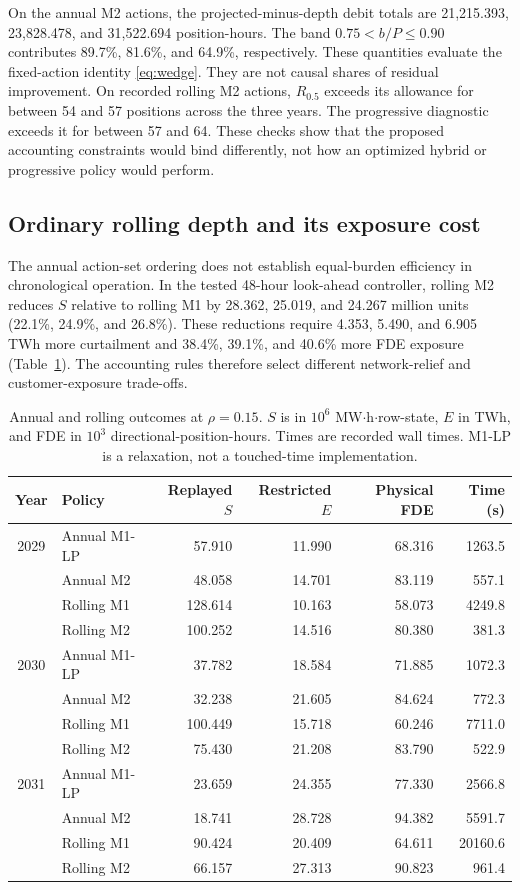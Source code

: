 \documentclass[10pt,journal]{IEEEtran}
\begin{document}
On the annual M2 actions, the projected-minus-depth debit totals are 21,215.393, 23,828.478, and 31,522.694 position-hours. The band $0.75<b/P\leq0.90$ contributes 89.7\%, 81.6\%, and 64.9\%, respectively. These quantities evaluate the fixed-action identity \eqref{eq:wedge}. They are not causal shares of residual improvement. On recorded rolling M2 actions, $R_{0.5}$ exceeds its allowance for between 54 and 57 positions across the three years. The progressive diagnostic exceeds it for between 57 and 64. These checks show that the proposed accounting constraints would bind differently, not how an optimized hybrid or progressive policy would perform.

\subsection{Ordinary rolling depth and its exposure cost}
The annual action-set ordering does not establish equal-burden efficiency in chronological operation. In the tested 48-hour look-ahead controller, rolling M2 reduces $S$ relative to rolling M1 by 28.362, 25.019, and 24.267 million units (22.1\%, 24.9\%, and 26.8\%). These reductions require 4.353, 5.490, and 6.905 TWh more curtailment and 38.4\%, 39.1\%, and 40.6\% more FDE exposure (Table~\ref{tab:original}). The accounting rules therefore select different network-relief and customer-exposure trade-offs.

\begin{table}[t]
\centering
\caption{Annual and rolling outcomes at $\rho=0.15$. $S$ is in $10^6$ MW$\cdot$h$\cdot$row-state, $E$ in TWh, and FDE in $10^3$ directional-position-hours. Times are recorded wall times. M1-LP is a relaxation, not a touched-time implementation.}
\label{tab:original}
\footnotesize
\begin{tabular}{@{}clrrrr@{}}
\toprule
Year & Policy & Replayed $S$ & Restricted $E$ & Physical FDE & Time (s)\\
\midrule
2029 & Annual M1-LP & 57.910 & 11.990 & 68.316 & 1263.5\\
& Annual M2 & 48.058 & 14.701 & 83.119 & 557.1\\
& Rolling M1 & 128.614 & 10.163 & 58.073 & 4249.8\\
& Rolling M2 & 100.252 & 14.516 & 80.380 & 381.3\\
\midrule
2030 & Annual M1-LP & 37.782 & 18.584 & 71.885 & 1072.3\\
& Annual M2 & 32.238 & 21.605 & 84.624 & 772.3\\
& Rolling M1 & 100.449 & 15.718 & 60.246 & 7711.0\\
& Rolling M2 & 75.430 & 21.208 & 83.790 & 522.9\\
\midrule
2031 & Annual M1-LP & 23.659 & 24.355 & 77.330 & 2566.8\\
& Annual M2 & 18.741 & 28.728 & 94.382 & 5591.7\\
& Rolling M1 & 90.424 & 20.409 & 64.611 & 20160.6\\
& Rolling M2 & 66.157 & 27.313 & 90.823 & 961.4\\
\bottomrule
\end{tabular}
\end{table}
\end{document}
